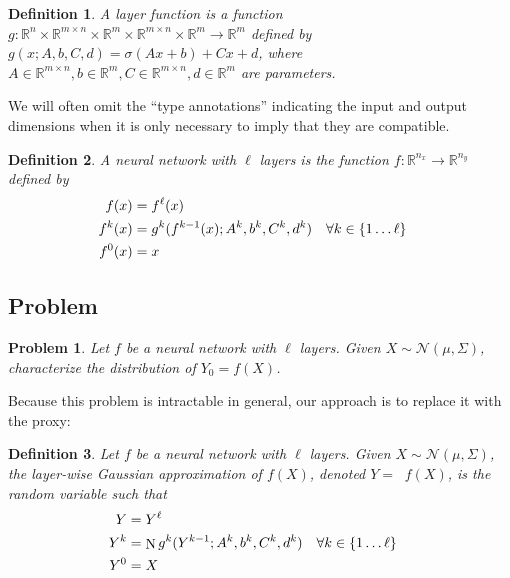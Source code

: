 \documentclass{article}
\newtheorem{definition}{Definition}
\newtheorem{problem}{Problem}
\DeclareMathOperator{\normal}{\mathrm N}
\DeclareMathOperator{\Normal}{\mathrm N^*}
\begin{document}
\begin{definition}
    \label{def:layer-function}
    A layer function is a function \(g:\mathbb R^n \times \mathbb R^{m \times n} \times \mathbb R^m \times \mathbb R^{m \times n} \times \mathbb R^m \to \mathbb R^m\) defined by \(g(x; A, b, C, d) = \sigma(A x + b) + C x + d\), where \(A \in \mathbb R^{m \times n}, b \in \mathbb R^m, C \in \mathbb R^{m \times n}, d \in \mathbb R^m\) are parameters.
\end{definition}

We will often omit the ``type annotations'' indicating the input and output dimensions when it is only necessary to imply that they are compatible.

\begin{definition}
    A neural network with \(\ell \) layers is the function \(f: \mathbb R^{n_x} \to \mathbb R^{n_y}\) defined by
    \begin{align*}
        f(x) &= f^\ell(x) \\
        f^k(x) &= g^k(f^{k-1}(x); A^k, b^k, C^k, d^k) & \forall k &\in \cbr{1 \ldots \ell} \\
        f^0(x) &= x
    \end{align*}
\end{definition}

\subsection{Problem}
\begin{problem}
    Let \(f\) be a neural network with \(\ell\) layers.
    Given \(X \sim \mathcal N(\mu, \Sigma)\), characterize the distribution of \(Y_0 = f(X)\).
\end{problem}

Because this problem is intractable in general, our approach is to replace it with the proxy:

\begin{definition}
    Let \(f\) be a neural network with \(\ell\) layers.
    Given \(X \sim \mathcal N(\mu, \Sigma)\), the layer-wise Gaussian approximation of \(f(X)\), denoted \(Y = \Normal f(X)\), is the random variable such that
    \begin{align*}
        Y &=  Y^\ell\\
        Y^k &= \normal g^k(Y^{k-1}; A^k, b^k, C^k, d^k) & \forall k &\in \cbr{1 \ldots \ell} \\
        Y^0 &= X
    \end{align*}
\end{definition}
\end{document}
